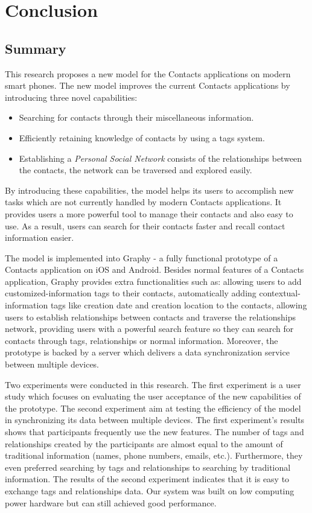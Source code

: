 \chapter{Conclusion}
\section{Summary}
This research proposes a new model for the Contacts applications on modern smart phones. The new model improves the current Contacts applications by introducing three novel capabilities:

\begin{itemize}
    \item {Searching for contacts through their miscellaneous information.}
    \item {Efficiently retaining knowledge of contacts by using a tags system.} 
    \item {Establishing a \textit{Personal Social Network} consists of the relationships between the contacts, the network can be traversed and explored easily.}
\end{itemize}

By introducing these capabilities, the model helps its users to accomplish new tasks which are not currently handled by modern Contacts applications. It provides users a more powerful tool to manage their contacts and also easy to use. As a result, users can search for their contacts faster and recall contact information easier.

The model is implemented into Graphy - a fully functional prototype of a Contacts application on iOS and Android. Besides normal features of a Contacts application, Graphy provides extra functionalities such as: allowing users to add customized-information tags to their contacts, automatically adding contextual-information tags like creation date and creation location to the contacts, allowing users to establish relationships between contacts and traverse the relationships network, providing users with a powerful search feature so they can search for contacts through tags, relationships or normal information. Moreover, the prototype is backed by a server which delivers a data synchronization service between multiple devices.

Two experiments were conducted in this research. The first experiment is a user study which focuses on evaluating the user acceptance of the new capabilities of the prototype. The second experiment aim at testing the efficiency of the model in synchronizing its data between multiple devices. The first experiment's results shows that participants frequently use the new features. The number of tags and relationships created by the participants are almost equal to the amount of traditional information (names, phone numbers, emails, etc.). Furthermore, they even preferred searching by tags and relationships to searching by traditional information. The results of the second experiment indicates that it is easy to exchange tags and relationships data. Our system was built on low computing power hardware but can still achieved good performance.

